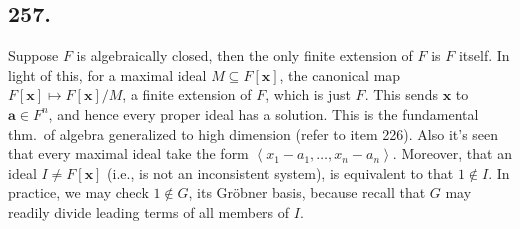 \documentclass[12pt]{article}
\newcommand{\V}\mathbf%
\newcommand{\Mp}\mapsto%
\newcommand{\Ab}[1]{ \left\langle #1 \right\rangle } %
\begin{document}
\subsection*{257.} Suppose \(F\) is algebraically closed, then the only finite extension of \(F\) is \(F\) itself. 
In light of this, for a maximal ideal \(M \subseteq F[\V{x}]\), the canonical map \(F[\V{x}] \Mp F[\V{x}]/M\), a finite extension of \(F\), which is just \(F\). 
This sends \(\V{x}\) to \(\V{a} \in F^n\), and hence every proper ideal has a solution. 
This is the fundamental thm.\ of algebra generalized to high dimension (refer to item 226). 
Also it's seen that every maximal ideal take the form \(\Ab{x_1-a_1, \dotsc, x_n-a_n}\). 
Moreover, that an ideal \(I \neq F[\V{x}]\) (i.e., is not an inconsistent system), is equivalent to that \(1 \notin I\). 
In practice, we may check \(1 \notin G\), its Gr\"obner basis, because recall that \(G\) may readily divide leading terms of all members of \(I\). 
\end{document}
